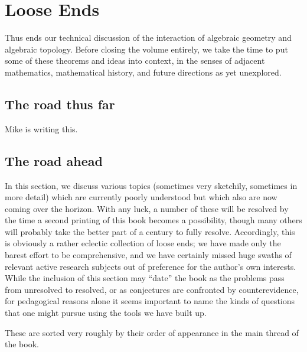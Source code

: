 
\chapter{Loose Ends}




Thus ends our technical discussion of the interaction of algebraic geometry and algebraic topology.  Before closing the volume entirely, we take the time to put some of these theorems and ideas into context, in the senses of adjacent mathematics, mathematical history, and future directions as yet unexplored.



\section{The road thus far}

\begin{center}
\Huge Mike is writing this.
\end{center}






\section{The road ahead}\label{OpenQuestionsSection}



In this section, we discuss various topics (sometimes very sketchily, sometimes in more detail) which are currently poorly understood but which also are now coming over the horizon.  With any luck, a number of these will be resolved by the time a second printing of this book becomes a possibility, though many others will probably take the better part of a century to fully resolve.  Accordingly, this is obviously a rather eclectic collection of loose ends; we have made only the barest effort to be comprehensive, and we have certainly missed huge swaths of relevant active research subjects out of preference for the author's own interests.  While the inclusion of this section may ``date'' the book as the problems pass from unresolved to resolved, or as conjectures are confronted by counterevidence, for pedagogical reasons alone it seems important to name the kinds of questions that one might pursue using the tools we have built up.

These are sorted very roughly by their order of appearance in the main thread of the book.








